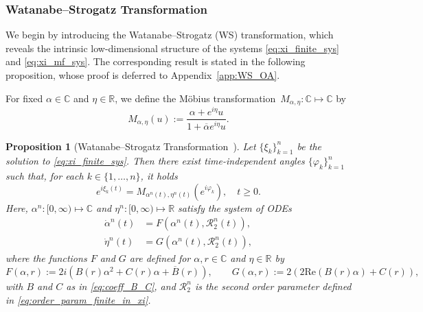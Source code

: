 \documentclass[10pt]{article}
\newtheorem{proposition}[theorem]{Proposition}
\theoremstyle{definition}
\theoremstyle{definition}
\numberwithin{equation}{section}
\newcommand{\R}{\mathbb{R}}
\newcommand{\BBC}{\mathbb{C}}
\newcommand{\CR}{\mathcal{R}}
\newcommand{\re}[1]{\mathrm{Re}\left(#1\right)}
\newcommand{\alphaBar}{\overline{\alpha}}
\begin{document}
\subsubsection{Watanabe--Strogatz Transformation}\label{subsec:WS}
We begin by introducing the Watanabe--Strogatz (WS) transformation, which reveals the intrinsic low-dimensional structure of the systems \eqref{eq:xi_finite_sys} and \eqref{eq:xi_mf_sys}.
The corresponding result is stated in the following proposition, whose proof is deferred to Appendix~\ref{app:WS_OA}.

For fixed $\alpha\in\BBC$ and $\eta \in \R$, we define the Möbius transformation~$M_{\alpha, \eta}: \BBC \mapsto \BBC$ by
\begin{equation}\label{eq:Mobius_tf}
M_{\alpha, \eta} (u) := \frac{\alpha + e^{i\eta} u}{1 + \alphaBar e^{i\eta} u}.
\end{equation}

\begin{proposition}[Watanabe--Strogatz Transformation~\cite{marvel2009identical}]\label{prop:WS_transform}
Let $\{\xi_k\}_{k=1}^n$ be the solution to \eqref{eq:xi_finite_sys}.
Then there exist time-independent angles $\{\varphi_k\}_{k=1}^n$ such that, for each $k \in \{1,\dots,n\}$, it holds
\begin{equation}\label{eq:action_of_M_finite_sys}
e^{i \xi_k(t)} = M_{\alpha^n(t), \eta^n(t)} \left( e^{i \varphi_k} \right), \quad t \geq 0. 
\end{equation} 
Here, $\alpha^n: [0, \infty) \mapsto \BBC$ and $\eta^n: [0, \infty) \mapsto \R$ satisfy the system of ODEs
\begin{subequations}\label{eq:WS_variable_finite_sys}
\begin{align}
\dot{\alpha}^n(t) &= F(\alpha^n(t), \CR_2^n(t)), \label{eq:alpha_finite_sys}\\
\dot{\eta}^n(t) &= G(\alpha^n(t), \CR_2^n(t)),
\end{align}
\end{subequations}
where the functions $F$ and $G$ are defined for $\alpha,r\in\BBC$ and $\eta\in\R$ by
\begin{equation}\label{eq:F_and_G}
F(\alpha, r) := 2i \left( B(r) \alpha^2 + C (r) \alpha + \overline{B} (r)\right), \qquad G(\alpha, r) := 2\left(2 \re{B(r) \alpha} + C(r) \right),
\end{equation}
with $B$ and $C$ as in \eqref{eq:coeff_B_C}, and $\CR_2^n$ is the second order parameter defined in \eqref{eq:order_param_finite_in_xi}.
\end{proposition} 
\end{document}
